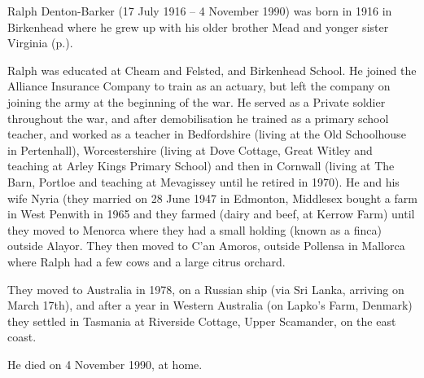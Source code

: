 
Ralph Denton-Barker (17 July 1916 -- 4 November 1990) was born in 1916 in Birkenhead \cite{BMDIndex_RalphMundayDentonBarker_birth} where he grew up with his older brother Mead and yonger sister Virginia (p.\pageref{Virginia_Kathleen_Denton_Barker}).

Ralph was educated at Cheam and Felsted, and Birkenhead School. He joined the Alliance Insurance Company to train as an actuary, but left the company on joining the army at the beginning of the war. He served as a Private soldier throughout the war, and after demobilisation he trained as a primary school teacher, and worked as a teacher in Bedfordshire (living at the Old Schoolhouse in Pertenhall), Worcestershire (living at Dove Cottage, Great Witley and teaching at Arley Kings Primary School) and then in Cornwall (living at The Barn, Portloe and teaching at Mevagissey until he retired in 1970). He and his wife Nyria (they married on 28 June 1947 in Edmonton, Middlesex \cite{MarriageCertRalphDentonBarkerJoanNyriaPowell} bought a farm in West Penwith in 1965 and they farmed (dairy and beef, at Kerrow Farm) until they moved to Menorca where they had a small holding (known as a finca) outside Alayor. They then moved to C'an Amoros, outside Pollensa in Mallorca where Ralph had a few cows and a large citrus orchard.

They moved to Australia in 1978, on a Russian ship (via Sri Lanka, arriving on March 17th), and after a year in Western Australia (on Lapko's Farm, Denmark) they settled in Tasmania at Riverside Cottage, Upper Scamander, on the east coast.

He died on 4 November 1990, at home.

